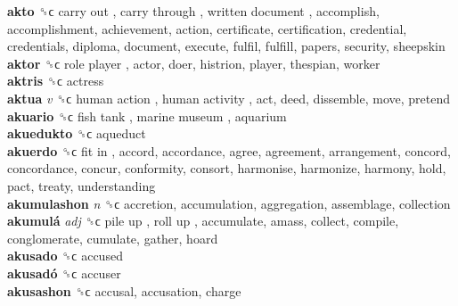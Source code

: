 \textbf{akto} ␝ϲ   carry out ,  carry through ,  written document , accomplish, accomplishment, achievement, action, certificate, certification, credential, credentials, diploma, document, execute, fulfil, fulfill, papers, security, sheepskin  \\
\textbf{aktor} ␝ϲ   role player , actor, doer, histrion, player, thespian, worker  \\
\textbf{aktris} ␝ϲ  actress  \\
\textbf{aktua} \emph{v}  ␝ϲ   human action ,  human activity , act, deed, dissemble, move, pretend  \\
\textbf{akuario} ␝ϲ   fish tank ,  marine museum , aquarium  \\
\textbf{akuedukto} ␝ϲ  aqueduct  \\
\textbf{akuerdo} ␝ϲ   fit in , accord, accordance, agree, agreement, arrangement, concord, concordance, concur, conformity, consort, harmonise, harmonize, harmony, hold, pact, treaty, understanding  \\
\textbf{akumulashon} \emph{n}  ␝ϲ  accretion, accumulation, aggregation, assemblage, collection  \\
\textbf{akumulá} \emph{adj}  ␝ϲ   pile up ,  roll up , accumulate, amass, collect, compile, conglomerate, cumulate, gather, hoard  \\
\textbf{akusado} ␝ϲ  accused  \\
\textbf{akusadó} ␝ϲ  accuser  \\
\textbf{akusashon} ␝ϲ  accusal, accusation, charge  \\
